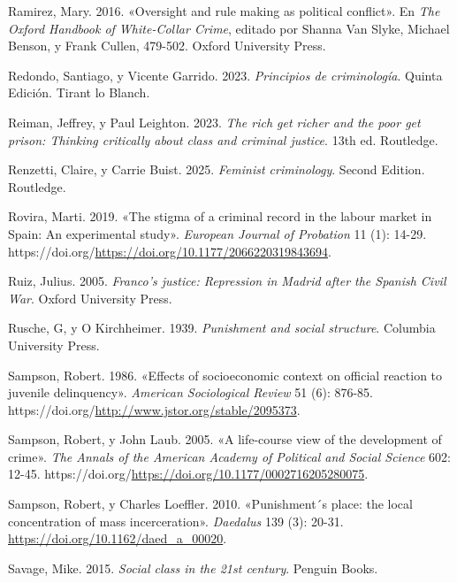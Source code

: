 \documentclass[
  spanish,
  letterpaper,
  DIV=11,
  numbers=noendperiod]{scrreprt}
\newlength{\cslhangindent}
\newenvironment{CSLReferences}[2] %
 {\begin{list}{}{%
  \setlength{\itemindent}{0pt}
  \setlength{\leftmargin}{0pt}
  \setlength{\parsep}{0pt}
  \ifodd #1
   \setlength{\leftmargin}{\cslhangindent}
   \setlength{\itemindent}{-1\cslhangindent}
  \fi
  \setlength{\itemsep}{#2\baselineskip}}}
 {\end{list}}
\begin{document}
\begin{CSLReferences}{1}{0}
Ramirez, Mary. 2016. {«Oversight and rule making as political
conflict»}. En \emph{The Oxford Handbook of White-Collar Crime}, editado
por Shanna Van Slyke, Michael Benson, y Frank Cullen, 479-502. Oxford
University Press.

Redondo, Santiago, y Vicente Garrido. 2023. \emph{Principios de
criminología}. Quinta Edición. Tirant lo Blanch.

Reiman, Jeffrey, y Paul Leighton. 2023. \emph{The rich get richer and
the poor get prison: Thinking critically about class and criminal
justice}. 13th ed. Routledge.

Renzetti, Claire, y Carrie Buist. 2025. \emph{Feminist criminology}.
Second Edition. Routledge.

Rovira, Marti. 2019. {«The stigma of a criminal record in the labour
market in Spain: An experimental study»}. \emph{European Journal of
Probation} 11 (1): 14-29.
https://doi.org/\url{https://doi.org/10.1177/2066220319843694}.

Ruiz, Julius. 2005. \emph{Franco's justice: Repression in Madrid after
the Spanish Civil War}. Oxford University Press.

Rusche, G, y O Kirchheimer. 1939. \emph{Punishment and social
structure}. Columbia University Press.

Sampson, Robert. 1986. {«Effects of socioeconomic context on official
reaction to juvenile delinquency»}. \emph{American Sociological Review}
51 (6): 876-85.
https://doi.org/\url{http://www.jstor.org/stable/2095373}.

Sampson, Robert, y John Laub. 2005. {«A life-course view of the
development of crime»}. \emph{The Annals of the American Academy of
Political and Social Science} 602: 12-45.
https://doi.org/\url{https://doi.org/10.1177/0002716205280075}.

Sampson, Robert, y Charles Loeffler. 2010. {«Punishment´s place: the
local concentration of mass incerceration»}. \emph{Daedalus} 139 (3):
20-31. \url{https://doi.org/10.1162/daed_a_00020}.

Savage, Mike. 2015. \emph{Social class in the 21st century}. Penguin
Books.


\end{CSLReferences}
\end{document}
